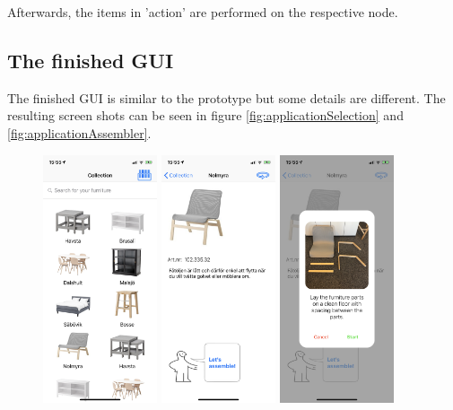 Afterwards, the items in 'action' are performed on the respective node.

\subsection{The finished GUI}
The finished GUI is similar to the prototype but some details are different. The resulting screen shots
can be seen in figure \ref{fig:applicationSelection} and \ref{fig:applicationAssembler}.

\begin{figure}[!hbtp]
\begin{center}
\includegraphics[width = 0.3\textwidth]{./Images/Application1}
\includegraphics[width = 0.3\textwidth]{./Images/Application2}
\includegraphics[width = 0.3\textwidth]{./Images/Application3}

\end{center}
\end{figure}
